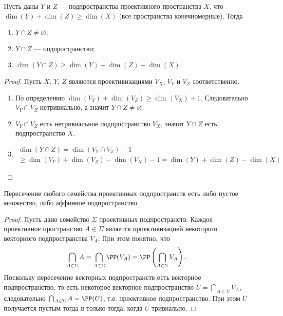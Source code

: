 \documentclass[12pt,a4paper]{article}
\begin{document}
    \begin{theorem}\label{proj-subspaces-intersection-theorem}
        Пусть даны $Y$ и $Z$ --- подпространства проективного пространства $X$, что $\dim(Y) + \dim(Z) \geqslant \dim(X)$ (все пространства конечномерные). Тогда
        \begin{enumerate}
            \item $Y \cap Z \neq \varnothing$;
            \item $Y \cap Z$ --- подпространство;
            \item $\dim(Y \cap Z) \geqslant \dim(Y) + \dim(Z) - \dim(X)$.
        \end{enumerate}
    \end{theorem}

    \begin{proof}
        Пусть $X$, $Y$, $Z$ являются проективизациями $V_X$, $V_Y$ и $V_Z$ соответственно.
        \begin{enumerate}
            \item По определению $\dim(V_Y) + \dim(V_Z) \geqslant \dim(V_X) + 1$. Следовательно $V_Y \cap V_Z$ нетривиально, а значит $Y \cap Z \neq \varnothing$.
            \item $V_Y \cap V_Z$ есть нетривиальное подпространство $V_X$, значит $Y \cap Z$ есть подпространство $X$.
            \item
                \begin{multline*}
                    \dim(Y \cap Z)
                    = \dim(V_Y \cap V_Z) - 1\\
                    \geqslant \dim(V_Y) + \dim(V_Z) - \dim(V_X) - 1
                    = \dim(Y) + \dim(Z) - \dim(X)
                \end{multline*}
        \end{enumerate}
    \end{proof}

    \begin{theorem}
        Пересечение любого семейства проективных подпространств есть либо пустое множество, либо аффинное подпространство.
    \end{theorem}

    \begin{proof}
        Пусть дано семейство $\Sigma$ проективных подпространств. Каждое проективное пространство $A \in \Sigma$ является проективизацией некоторого векторного подпространства $V_A$. При этом понятно, что
        \[\bigcap_{A \in \Sigma} A = \bigcap_{A \in \Sigma} \PP(V_A) = \PP\left(\bigcap_{A \in \Sigma} V_A\right).\]
        Поскольку пересечение векторных подпространств есть векторное подпространство, то есть некоторое векторное подпространство $U = \bigcap_{A \in \Sigma} V_A$, следовательно $\bigcap_{A \in \Sigma} A = \PP(U)$, т.е. проективное подпространство. При этом $U$ получается пустым тогда и только тогда, когда $U$ тривиально.
    \end{proof}
\end{document}
